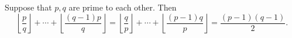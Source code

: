 Suppose that $p, q$ are prime to each other. Then
\[ \left\lfloor \frac{p}{q} \right\rfloor + \cdots + \left\lfloor \frac{(q - 1)p}{q} \right\rfloor = \left\lfloor \frac{q}{p} \right\rfloor + \cdots + \left\lfloor \frac{(p - 1)q}{p} \right\rfloor = \frac{(p - 1)(q - 1)}{2}. \]

